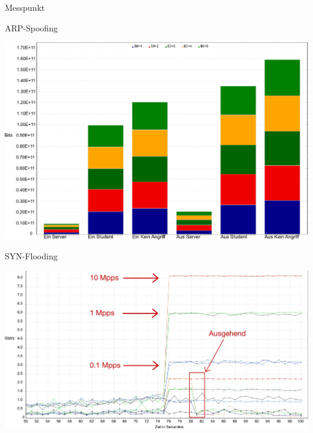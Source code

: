 \begin{frame}{Messpunkt}
	\begin{center}
		
	\end{center}
\end{frame}


\begin{frame}{ARP-Spoofing}
	\begin{center}
		\includegraphics[keepaspectratio,
		width=\paperwidth,
		height=0.8\paperheight]{pic/arp/ArpBitIrb.png}
	\end{center}
\end{frame}

\begin{frame}{SYN-Flooding}
	\begin{center}
		\includegraphics[keepaspectratio,
		width=\paperwidth,
		height=0.8\paperheight]{pic/dos/InternetRouterThruput}
	\end{center}
\end{frame}

